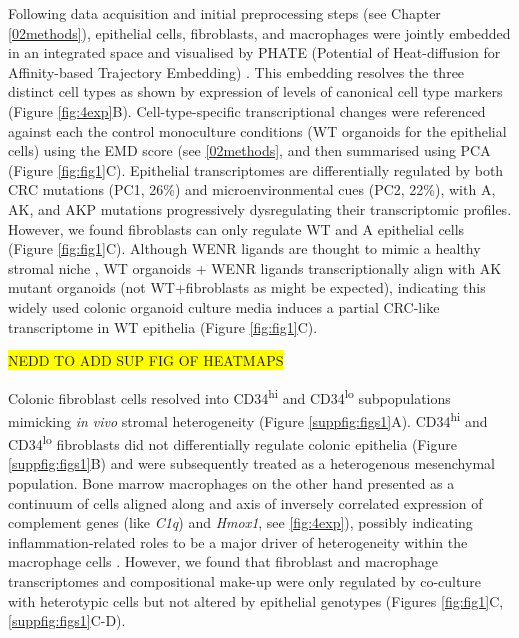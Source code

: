 Following data acquisition and initial preprocessing steps (see Chapter \ref{02methods}), epithelial cells, fibroblasts, and macrophages were jointly embedded in an integrated space and visualised by PHATE (Potential of Heat-diffusion for Affinity-based Trajectory Embedding) \cite{moon_visualizing_2019}. This embedding resolves the three distinct cell types as shown by expression of levels of canonical cell type markers (Figure \ref{fig:4exp}B). 
Cell-type-specific transcriptional changes were referenced against each the control monoculture conditions (WT organoids for the epithelial cells) using the EMD score (see \ref{02methods}, and then summarised using PCA (Figure \ref{fig:fig1}C). Epithelial transcriptomes are differentially regulated by both CRC mutations (PC1, 26\%) and microenvironmental cues (PC2, 22\%), with A, AK, and AKP mutations progressively dysregulating their transcriptomic profiles. However, we found fibroblasts can only regulate WT and A epithelial cells (Figure \ref{fig:fig1}C). Although WENR ligands are thought to mimic a healthy stromal niche \cite{mahe_establishment_2013}, WT organoids + WENR ligands transcriptionally align with AK mutant organoids (not WT+fibroblasts as might be expected), indicating this widely used colonic organoid culture media induces a partial CRC-like transcriptome in WT epithelia (Figure \ref{fig:fig1}C).


\colorbox{yellow}{NEDD TO ADD SUP FIG OF HEATMAPS}

Colonic fibroblast cells resolved into CD34\textsuperscript{hi} and CD34\textsuperscript{lo} subpopulations mimicking \textit{in vivo} stromal heterogeneity \cite{karpus_colonic_2019} (Figure \ref{suppfig:figs1}A). CD34\textsuperscript{hi} and CD34\textsuperscript{lo} fibroblasts did not differentially regulate colonic epithelia (Figure \ref{suppfig:figs1}B) and were subsequently treated as a heterogenous mesenchymal population. Bone marrow macrophages on the other hand presented as a continuum of cells aligned along and axis of inversely correlated expression of complement genes (like \emph{C1q}) and \emph{Hmox1}, see \ref{fig:4exp}), possibly indicating inflammation-related roles to be a major driver of heterogeneity within the macrophage cells \cite{naito_heme_2014}. However, we found that fibroblast and macrophage transcriptomes and compositional make-up were only regulated by co-culture with heterotypic cells but not altered by epithelial genotypes (Figures \ref{fig:fig1}C, \ref{suppfig:figs1}C-D). 



